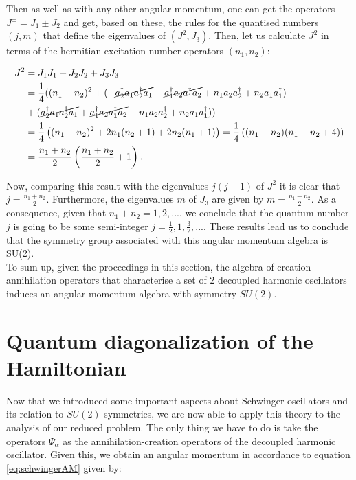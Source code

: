 Then as well as with any other angular momentum, one can get the operators $J^\pm = J_1\pm J_2$ and get, based on these, the rules for the quantised numbers $(j,m)$ that define the eigenvalues of $(J^2,J_3)$. Then, let us calculate $J^2$ in terms of the hermitian excitation number operators $(n_1,n_2)$:

\begin{align*}
J^2 &= J_1J_1+J_2J_2+J_3J_3\\
&= \frac{1}{4}( (n_1-n_2)^2 +(-\cancel{a_2^\dagger a_1a_2^\dagger a_1}- \cancel{a_1^\dagger a_2a_1^\dagger a_2}+n_1a_2a_2^\dagger+n_2a_1a_1^\dagger)\\
&+(\cancel{a_2^\dagger a_1a_2^\dagger a_1}+ \cancel{a_1^\dagger a_2a_1^\dagger a_2}+n_1a_2a_2^\dagger+n_2a_1a_1^\dagger))\\
&= \frac{1}{4}\left( (n_1-n_2)^2 + 2n_1(n_2+1)+2n_2(n_1+1) \right) = \frac{1}{4}\left( (n_1+n_2)(n_1+n_2+4) \right)\\
&= \frac{n_1+n_2}{2}\left( \frac{n_1+n_2}{2}+1 \right).
\end{align*}

Now, comparing this result with the eigenvalues $j(j+1)$ of $J^2$ it is clear that $j = \frac{n_1+n_2}{2}$. Furthermore, the eigenvalues $m$ of $J_3$ are given by  $m = \frac{n_1-n_2}{2}$. As a consequence, given that $n_1+n_2 = 1,2,...$, we conclude that the quantum number $j$ is going to be some semi-integer $j= \frac{1}{2},1,\frac{3}{2},...$. These results lead us to conclude that the symmetry group associated with this angular momentum algebra is SU(2).\\

To sum up, given the proceedings in this section, the algebra of creation-annihilation operators that characterise a set of 2 decoupled harmonic oscillators induces an angular momentum algebra with symmetry $SU(2)$.

\section{Quantum diagonalization of the Hamiltonian}
Now that we introduced some important aspects about Schwinger oscillators and its relation to $SU(2)$ symmetries, we are now able to apply this theory to the analysis of our reduced problem. The only thing we have to do is take the operators $\Psi_\alpha$ as the annihilation-creation operators of the decoupled harmonic oscillator. Given this, we obtain an angular momentum in accordance to equation \eqref{eq:schwingerAM} given by:

